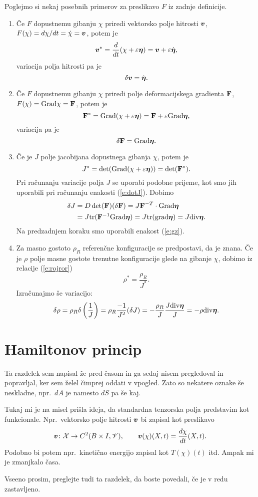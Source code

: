 \begin{primeri}
	Poglejmo si nekaj posebnih primerov za preslikavo $F$ iz zadnje definicije.
	\begin{enumerate}
		\item
			Če $F$ dopustnemu gibanju $\chi$ priredi vektorsko polje hitrosti $\boldsymbol v$,
			$F(\chi)=d\chi/dt=\dot{\chi}=\boldsymbol v$, potem je
			\[ \boldsymbol v^*=\frac{d}{dt}(\chi+\varepsilon\boldsymbol \eta)=\boldsymbol v+\varepsilon\dot{\boldsymbol \eta}, \]
			variacija polja hitrosti pa je
			\[ \delta\boldsymbol v=\dot{\boldsymbol \eta}. \]
		\item
			Če $F$ dopustnemu gibanju $\chi$ priredi polje deformacijskega gradienta $\mathbf F$,
			$F(\chi)=\mathrm{Grad}{\chi}=\mathbf F$, potem je
			\[ \mathbf F^*=\mathrm{Grad}(\chi+\varepsilon\boldsymbol \eta)=\mathbf F+\varepsilon\mathrm{Grad}\boldsymbol \eta, \]
			variacija pa je
			\[ \delta\mathbf F=\mathrm{Grad}\boldsymbol \eta. \]
		\item
			Če je $J$ polje jacobijana dopustnega gibanja $\chi$, potem je
			\[ J^*=\det(\mathrm{Grad}(\chi+\varepsilon\boldsymbol \eta))=\det(\mathbf F^*). \]
			Pri računanju variacije polja $J$ se uporabi podobne prijeme,
			kot smo jih uporabili pri računanju enakosti (\ref{e:dotJ}). Dobimo
			\begin{align*}
				\delta J&=D\det(\mathbf F)(\delta\mathbf F)=J\mathbf F^{-T}\cdot\mathrm{Grad}\boldsymbol \eta\\
				&=J\mathrm{tr}(\mathbf F^{-1}\mathrm{Grad}\boldsymbol \eta)=J\mathrm{tr}(\mathrm{grad}\boldsymbol \eta)=J\mathrm{div}\boldsymbol \eta.
			\end{align*}
			Na predzadnjem koraku smo uporabili enakost (\ref{e:gz}).
		\item
			Za masno gostoto $\rho_R$ referenčne konfiguracije se predpostavi, da je znana. Če je
			$\rho$ polje masne gostote trenutne konfiguracije glede na gibanje $\chi$,
			dobimo iz relacije (\ref{e:rojror})
			\[ \rho^*=\frac{\rho_R}{J^*}. \]
			Izračunajmo še variacijo:
			\[
				\delta\rho=\rho_R\delta\left(\frac{1}{J}\right)=
				\rho_R\frac{-1}{J^2}(\delta J)=-\frac{\rho_R}{J}\frac{J\mathrm{div}\boldsymbol \eta}{J}=-\rho\mathrm{div}\boldsymbol \eta.
			\]
	\end{enumerate}
\end{primeri}


\section{Hamiltonov princip}


\begin{rdece}Ta razdelek sem napisal že pred časom in ga sedaj nisem pregledoval
in popravljal, ker sem želel čimprej oddati v vpogled. Zato so nekatere oznake še
neskladne, npr.~$dA$ je namesto $dS$ pa še kaj.

Tukaj mi je na misel prišla ideja,
da standardna tenzorska polja predstavim kot funkcionale. Npr.~vektorsko polje hitrosti
$\boldsymbol v$ bi zapisal kot preslikavo
\[ \boldsymbol v\colon\mathcal{X}\to C^2(B\times I,\mathscr V),\qquad \boldsymbol v(\chi)(X,t)=\frac{d\chi}{dt}(X,t). \]
Podobno bi potem npr.~kinetično energijo zapisal kot $T(\chi)(t)$ itd. Ampak mi je zmanjkalo časa.

Vseeno prosim, preglejte tudi ta razdelek, da boste povedali, če je v redu zastavljeno.
\end{rdece}

